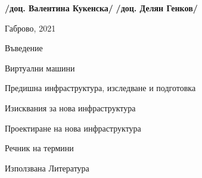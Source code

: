 \documentclass[11pt,a4paper]{article}
\begin{document}
\begin{center}
{			\begin{flushright}
				\Large{\textbf{/доц. Валентина Кукенска/}}\hspace{4cm} \Large{\textbf{/доц. Делян Генков/}}     
			\end{flushright}
			\vspace*{1.7cm}
			\Large{Габрово, 2021}    
		}
	\end{center}
	\newpage
	
	\tableofcontents
	\newpage
	
	{Въведение}\label{Introduction}
	\newpage
	
	{Виртуални машини}\label{Sect1}
	\newpage
	
	{Предишна инфраструктура, изследване и подготовка}\label{Sect2}
	\newpage
	
	{Изисквания за нова инфраструктура}\label{Sect3}
	\newpage
	
	{Проектиране на нова инфраструктура}\label{Sect4}
	\newpage
	
	{Речник на термини}\label{Sect5}
	\newpage
	


{Използвана Литература}\label{Sect7}
%
\newpage

	\label{Ackn}

\newpage
%

%


%
\end{document}
